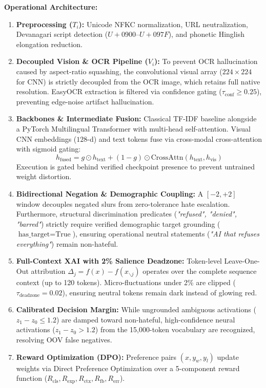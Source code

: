 \documentclass[10pt,twocolumn]{article}
\begin{document}
\textbf{Operational Architecture:}
\begin{enumerate}
    \item \textbf{Preprocessing ($T_i$):} Unicode NFKC normalization, URL neutralization, Devanagari script detection ($U+0900$--$U+097F$), and phonetic Hinglish elongation reduction.
    \item \textbf{Decoupled Vision \& OCR Pipeline ($V_i$):} To prevent OCR hallucination caused by aspect-ratio squashing, the convolutional visual array ($224 \times 224$ for CNN) is strictly decoupled from the OCR image, which retains full native resolution. EasyOCR extraction is filtered via confidence gating ($\tau_{\text{conf}} \ge 0.25$), preventing edge-noise artifact hallucination.
    \item \textbf{Backbones \& Intermediate Fusion:} Classical TF-IDF baseline alongside a PyTorch Multilingual Transformer with multi-head self-attention. Visual CNN embeddings ($128$-d) and text tokens fuse via cross-modal cross-attention with sigmoid gating:
    \begin{equation}
        h_{\text{fused}} = g \odot h_{\text{text}} + (1 - g) \odot \text{CrossAttn}(h_{\text{text}}, h_{\text{vis}})
    \end{equation}
    Execution is gated behind verified checkpoint presence to prevent untrained weight distortion.
    \item \textbf{Bidirectional Negation \& Demographic Coupling:} A $[-2, +2]$ window decouples negated slurs from zero-tolerance hate escalation. Furthermore, structural discrimination predicates (\textit{"refused", "denied", "barred"}) strictly require verified demographic target grounding ($\text{has\_target} = \text{True}$), ensuring operational neutral statements (\textit{"AI that refuses everything"}) remain non-hateful.
    \item \textbf{Full-Context XAI with 2\% Salience Deadzone:} Token-level Leave-One-Out attribution $\Delta_j = f(x) - f(x_{\backslash j})$ operates over the complete sequence context (up to 120 tokens). Micro-fluctuations under 2\% are clipped ($\tau_{\text{deadzone}} = 0.02$), ensuring neutral tokens remain dark instead of glowing red.
    \item \textbf{Calibrated Decision Margin:} While ungrounded ambiguous activations ($z_1 - z_0 \le 1.2$) are damped toward non-hateful, high-confidence neural activations ($z_1 - z_0 > 1.2$) from the 15,000-token vocabulary are recognized, resolving OOV false negatives.
    \item \textbf{Reward Optimization (DPO):} Preference pairs $(x, y_w, y_l)$ update weights via Direct Preference Optimization over a 5-component reward function ($R_{\text{cls}}, R_{\text{exp}}, R_{\text{ctx}}, R_{\text{fb}}, R_{\text{err}}$).
\end{enumerate}
\end{document}
